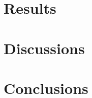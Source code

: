 \documentclass[letterpaper]{article}
\begin{document}
\section{Results}

\section{Discussions}


\section{Conclusions}
{}



\end{document}

